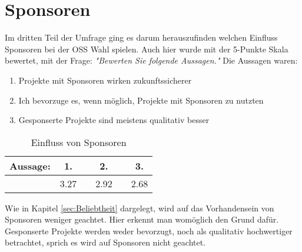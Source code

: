\section{Sponsoren}
Im dritten Teil der Umfrage ging es darum herauszufinden welchen Einfluss Sponsoren bei der OSS Wahl
spielen. Auch hier wurde mit der 5-Punkte Skala bewertet, mit der Frage: \textit{"Bewerten Sie folgende
    Aussagen."} Die Aussagen waren:

\begin{enumerate}
    \setlength\itemsep{0em}
    \item Projekte mit Sponsoren wirken zukunftssicherer
    \item Ich bevorzuge es, wenn möglich, Projekte mit Sponsoren zu nutzten
    \item Gesponserte Projekte sind meistens qualitativ besser
\end{enumerate}

\begin{table}[]
    \begin{tabular}{cccccc}
        \hline
        Aussage: \hspace{1cm} & 1.   & \hspace{0.75cm} & 2.   & \hspace{0.75cm} & 3.   \\ \hline
                              & 3.27 &                 & 2.92 &                 & 2.68
    \end{tabular}%
    \caption{\label{tab:sponsorens}Einfluss von Sponsoren}
\end{table}


\noindent
{}

Wie in Kapitel \ref{sec:Beliebtheit} dargelegt, wird auf das Vorhandensein von Sponsoren weniger geachtet.
Hier erkennt man womöglich den Grund dafür.
Gesponserte Projekte werden weder bevorzugt, noch als qualitativ
hochwertiger betrachtet, sprich es wird auf Sponsoren nicht geachtet.
